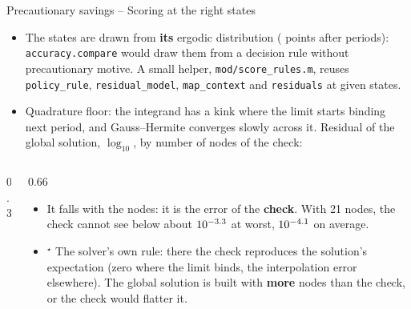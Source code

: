 \documentclass[11pt,aspectratio=169]{beamer}
\newcommand{\code}[1]{\texttt{#1}}
\begin{document}
\begin{frame}{Precautionary savings -- Scoring at the right states}

\begin{itemize}

\item The states are drawn from \textbf{its} ergodic distribution (\bsPoints{} points after \bsBurn{} periods): \code{accuracy.compare} would draw them from a decision rule without precautionary motive. A small helper, \code{mod/score\_rules.m}, reuses \code{policy\_rule}, \code{residual\_model}, \code{map\_context} and \code{residuals} at given states.\newline

\item Quadrature floor: the integrand has a kink where the limit starts binding next period, and Gauss--Hermite converges slowly across it. Residual of the global solution, $\log_{10}$, by number of nodes of the check:

\end{itemize}

\begin{columns}[T]
\begin{column}{0.3\textwidth}
\centering
\footnotesize

\end{column}
\begin{column}{0.66\textwidth}
\begin{itemize}
\small

\item It falls with the nodes: it is the error of the \textbf{check}. With 21 nodes, the check cannot see below about $10^{-3.3}$ at worst, $10^{-4.1}$ on average.

\item $^\star$ The solver's own rule: there the check reproduces the solution's expectation (zero where the limit binds, the interpolation error elsewhere). The global solution is built with \textbf{more} nodes than the check, or the check would flatter it.

\end{itemize}
\end{column}
\end{columns}

\end{frame}
\end{document}
